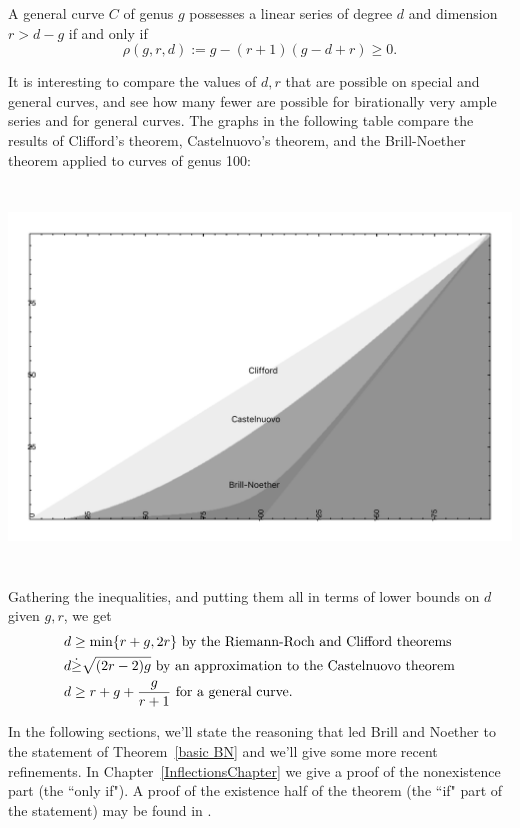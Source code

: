 \begin{theorem}\label{basic BN}
A general curve $C$ of genus $g$  possesses a linear series of degree $d$ and dimension $r>d-g$ if and only if
$$
 \rho(g,r,d) := g - (r+1)(g-d+r) \geq 0.
$$
\end{theorem}

It is interesting to compare the values of $d,r$ that are possible on special and general curves, and see how many fewer are possible for birationally very ample series and for general curves. The graphs in the following table compare the results of 
Clifford's theorem, Castelnuovo's theorem, and the Brill-Noether theorem applied to curves
of genus 100:

\centerline{ \includegraphics[height=4in]{"Clifford-Castelnuovo-Brill-Noether"}}

Gathering the inequalities, and putting them all in terms of lower bounds on $d$ given $g, r$,
we get \goodbreak
\begin{align*}
 d &\geq \min\{r+g, 2r\} \hbox{ by the Riemann-Roch and Clifford theorems}\\
 d &\dot\geq \sqrt{(2r-2)g} \hbox{ by an approximation to the Castelnuovo theorem}\\
 d &\geq r+g+\frac{g}{r+1} \hbox{ for a general curve.}
\end{align*}

In the following sections, we'll state the reasoning that led Brill and Noether to the statement of Theorem~\ref{basic BN} and we'll give some more recent refinements.   In Chapter~\ref{InflectionsChapter} we give a proof of the nonexistence part (the ``only if"). A proof of the existence half of the theorem (the ``if" part of the statement) may be found in \cite[Theorem ****]{3264}.

